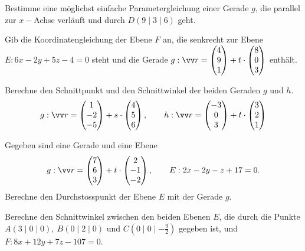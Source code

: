 \documentclass[11pt]{exam}
\begin{document}
\newpage
\begin{questions}
\question[2] %
Bestimme eine möglichst einfache Parametergleichung einer Gerade $g$, die parallel zur $x-$Achse verläuft und durch $D(9\mid3\mid6)$ geht. 

\question[3] %
Gib die Koordinatengleichung der Ebene $F$ an, die senkrecht zur Ebene\\ ${E:6x-2y+5z-4=0}$ steht und die Gerade $g:\v{r}=\Vec{4}{9}{1}+t\*\Vec{8}{0}{3}$ enthält.


\newpage
\noaddpoints
\question[\totalpoints]
\addpoints
{}


\newpage
\question[4]
Berechne den Schnittpunkt und den Schnittwinkel der beiden Geraden $g$ und $h$.
\[g:\v{r}=\Vec{1}{-2}{-5}+s\*\Vec{4}{5}{6}, \qquad h:\v{r}=\Vec{-3}{0}{3}+t\*\Vec{3}{2}{1}\]

\newpage
\question[3]
Gegeben sind eine Gerade und eine Ebene \[g:\v{r}=\Vec{7}{6}{3}+t\*\Vec{2}{-1}{-2},\qquad E:2x-2y-z+17=0.\]
Berechne den Durchstosspunkt der Ebene $E$ mit der Gerade $g$.

\question[3] %
Berechne den Schnittwinkel zwischen den beiden Ebenen $E$, die durch die Punkte $A(3\mid0\mid0),\: B(0\mid2\mid0)$ und ${C(0\mid0\mid-\frac{9}{2})}$ gegeben ist, und ${F:8x+12y+7z-107=0}$.



\end{questions}
\end{document}
